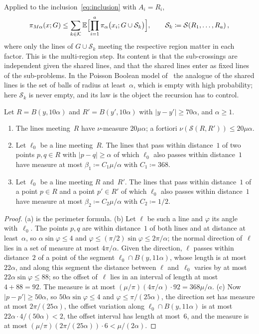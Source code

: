 \documentclass[11pt,letterpaper]{article}
\newcommand{\cS}{\mathcal S}
\begin{document}
Applied to the inclusion~\eqref{eq:inclusion} with $A_i=R_i$,
\begin{equation}
\label{eq:step}
  \pi_{M\alpha}(x;G)\le\sum_{k\in\mathcal K}\E\Bigl[\prod_{i=1}^a\pi_\alpha\bigl(x_i;G\cup\cS_k\bigr)\Bigr],\qquad\cS_k\coloneqq\cS(R_1,\dots,R_a)\,,
\end{equation}
where only the lines of $G\cup\cS_k$ meeting the respective region matter in each factor. This is the multi-region step. Its content is that the sub-crossings are independent given the shared lines, and that the shared lines enter as fixed lines of the sub-problems. In the Poisson Boolean model of~\cite{Gou08} the analogue of the shared lines is the set of balls of radius at least~$\alpha$, which is empty with high probability; here $\cS_k$ is never empty, and its law is the object the recursion has to control.

\begin{lemma}
\label{lem:shared}
Let $R=B(y,10\alpha)$ and $R'=B(y',10\alpha)$ with $\lvert y-y'\rvert\ge70\alpha$, and $\alpha\ge1$.
\begin{enumerate}
  \item[\emph{(a)}] The lines meeting~$R$ have $\nu$-measure $20\mu\alpha$; a fortiori $\nu(\cS(R,R'))\le20\mu\alpha$.
  \item[\emph{(b)}] Let $\ell_0$ be a line meeting~$R$. The lines that pass within distance~$1$ of two points $p,q\in R$ with $\lvert p-q\rvert\ge\alpha$ of which $\ell_0$ also passes within distance~$1$ have measure at most $\beta_1\coloneqq C_1\mu/\alpha$ with $C_1\coloneqq368$.
  \item[\emph{(c)}] Let $\ell_0$ be a line meeting $R$ and~$R'$. The lines that pass within distance~$1$ of a point $p\in R$ and a point $p'\in R'$ of which $\ell_0$ also passes within distance~$1$ have measure at most $\beta_2\coloneqq C_2\mu/\alpha$ with $C_2\coloneqq1/2$.
\end{enumerate}
\end{lemma}

\begin{proof}
(a) is the perimeter formula. (b) Let $\ell$ be such a line and $\varphi$ its angle with~$\ell_0$. The points $p,q$ are within distance~$1$ of both lines and at distance at least~$\alpha$, so $\alpha\sin\varphi\le4$ and $\varphi\le(\pi/2)\sin\varphi\le2\pi/\alpha$; the normal direction of~$\ell$ lies in a set of measure at most $4\pi/\alpha$. Given the direction, $\ell$ passes within distance~$2$ of a point of the segment $\ell_0\cap B(y,11\alpha)$, whose length is at most $22\alpha$, and along this segment the distance between $\ell$ and~$\ell_0$ varies by at most $22\alpha\sin\varphi\le88$; so the offset of~$\ell$ lies in an interval of length at most $4+88=92$. The measure is at most $(\mu/\pi)(4\pi/\alpha)\cdot92=368\mu/\alpha$. (c) Now $\lvert p-p'\rvert\ge50\alpha$, so $50\alpha\sin\varphi\le4$ and $\varphi\le\pi/(25\alpha)$, the direction set has measure at most $2\pi/(25\alpha)$, the offset variation along $\ell_0\cap B(y,11\alpha)$ is at most $22\alpha\cdot4/(50\alpha)<2$, the offset interval has length at most~$6$, and the measure is at most $(\mu/\pi)(2\pi/(25\alpha))\cdot6<\mu/(2\alpha)$.
\end{proof}
\end{document}
